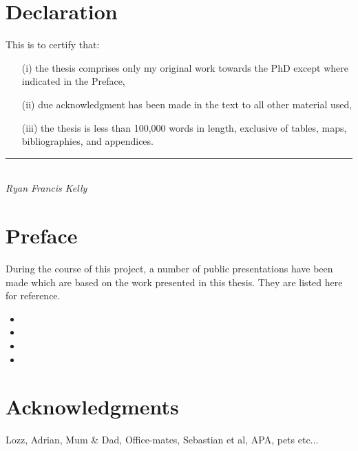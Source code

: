 \chapter*{Declaration}
This is to certify that:
\begin{itemize}
\item[(i)] the thesis comprises only my original work towards the PhD except where indicated in the Preface,
\item[(ii)] due acknowledgment has been made in the text to all other material used,
\item[(iii)] the thesis is less than 100,000 words in length, exclusive of tables, maps, bibliographies, and appendices.
\end{itemize}
\vspace{3cm}
\rule{70mm}{0.1mm}\\
\emph{Ryan Francis Kelly}

\chapter*{Preface}
During the course of this project, a number of public presentations have been
 made which are based on the work presented in this thesis. They are listed
 here for reference.

\nobibliography*
\begin{itemize}
\item {}
\item {}
\item {}
\item {}
\end{itemize}


\chapter*{Acknowledgments} %

Lozz, Adrian, Mum \& Dad, Office-mates, Sebastian et al, APA, pets etc...

\singlespace
\tableofcontents
\listoftables
\listoffigures

\newpage
{}









\appendix


\singlespace





